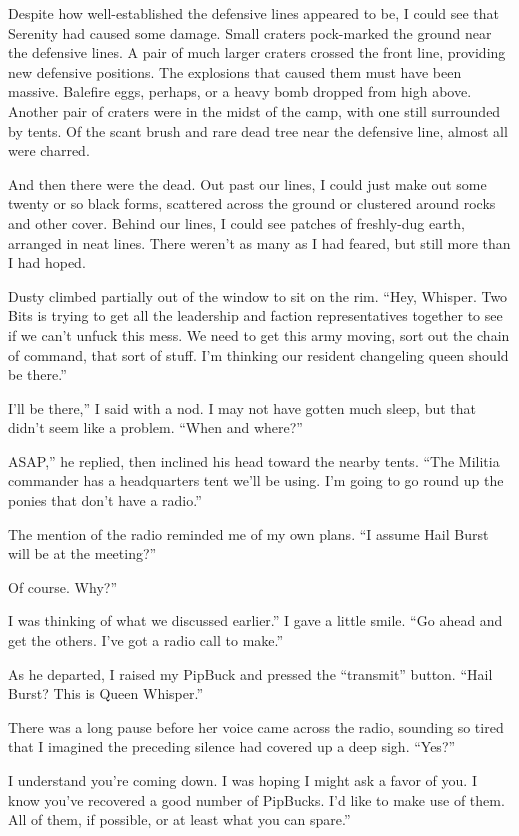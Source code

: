 Despite how well-established the defensive lines appeared to be, I could see that Serenity had caused some damage. Small craters pock-marked the ground near the defensive lines. A pair of much larger craters crossed the front line, providing new defensive positions. The explosions that caused them must have been massive. Balefire eggs, perhaps, or a heavy bomb dropped from high above. Another pair of craters were in the midst of the camp, with one still surrounded by tents. Of the scant brush and rare dead tree near the defensive line, almost all were charred.

And then there were the dead. Out past our lines, I could just make out some twenty or so black forms, scattered across the ground or clustered around rocks and other cover. Behind our lines, I could see patches of freshly-dug earth, arranged in neat lines. There weren’t as many as I had feared, but still more than I had hoped.

Dusty climbed partially out of the window to sit on the rim. “Hey, Whisper. Two Bits is trying to get all the leadership and faction representatives together to see if we can’t unfuck this mess. We need to get this army moving, sort out the chain of command, that sort of stuff. I’m thinking our resident changeling queen should be there.”

\leavevmode{}I’ll be there,” I said with a nod. I may not have gotten much sleep, but that didn’t seem like a problem. “When and where?”

\leavevmode{}ASAP,” he replied, then inclined his head toward the nearby tents. “The Militia commander has a headquarters tent we’ll be using. I’m going to go round up the ponies that don’t have a radio.”

The mention of the radio reminded me of my own plans. “I assume Hail Burst will be at the meeting?”

\leavevmode{}Of course. Why?”

\leavevmode{}I was thinking of what we discussed earlier.” I gave a little smile. “Go ahead and get the others. I’ve got a radio call to make.”

As he departed, I raised my PipBuck and pressed the “transmit” button. “Hail Burst? This is Queen Whisper.”

There was a long pause before her voice came across the radio, sounding so tired that I imagined the preceding silence had covered up a deep sigh. “Yes?”

\leavevmode{}I understand you’re coming down. I was hoping I might ask a favor of you. I know you’ve recovered a good number of PipBucks. I’d like to make use of them. All of them, if possible, or at least what you can spare.”

